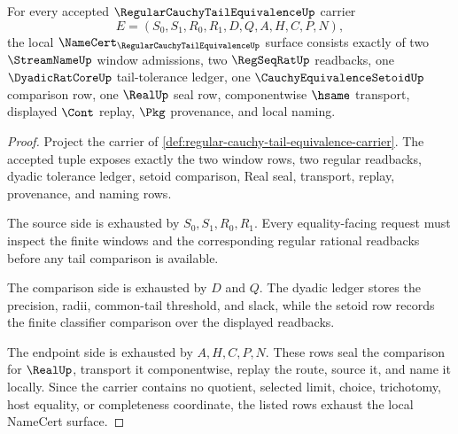 \begin{theorem}
\label{thm:regular-cauchy-tail-equivalence-namecert-obligations}
For every accepted $\RegularCauchyTailEquivalenceUp$ carrier
$$
E=(S_0,S_1,R_0,R_1,D,Q,A,H,C,P,N),
$$
the local $\NameCert_{\RegularCauchyTailEquivalenceUp}$ surface consists exactly of two $\StreamNameUp$ window admissions, two $\RegSeqRatUp$ readbacks, one $\DyadicRatCoreUp$ tail-tolerance ledger, one $\CauchyEquivalenceSetoidUp$ comparison row, one $\RealUp$ seal row, componentwise $\hsame$ transport, displayed $\Cont$ replay, $\Pkg$ provenance, and local naming.
\end{theorem}
\begin{proof}
Project the carrier of \autoref{def:regular-cauchy-tail-equivalence-carrier}. The accepted tuple exposes exactly the two window rows, two regular readbacks, dyadic tolerance ledger, setoid comparison, Real seal, transport, replay, provenance, and naming rows.

The source side is exhausted by $S_0,S_1,R_0,R_1$. Every equality-facing request must inspect the finite windows and the corresponding regular rational readbacks before any tail comparison is available.

The comparison side is exhausted by $D$ and $Q$. The dyadic ledger stores the precision, radii, common-tail threshold, and slack, while the setoid row records the finite classifier comparison over the displayed readbacks.

The endpoint side is exhausted by $A,H,C,P,N$. These rows seal the comparison for $\RealUp$, transport it componentwise, replay the route, source it, and name it locally. Since the carrier contains no quotient, selected limit, choice, trichotomy, host equality, or completeness coordinate, the listed rows exhaust the local NameCert surface.
\end{proof}

